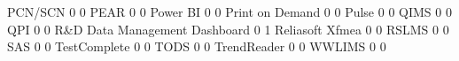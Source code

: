 \documentclass{article}
\begin{document}
\begin{Schunk}
\begin{Soutput}
  PCN/SCN                                                              0   0
  PEAR                                                                 0   0
  Power BI                                                             0   0
  Print on Demand                                                      0   0
  Pulse                                                                0   0
  QIMS                                                                 0   0
  QPI                                                                  0   0
  R&D Data Management Dashboard                                        0   1
  Reliasoft Xfmea                                                      0   0
  RSLMS                                                                0   0
  SAS                                                                  0   0
  TestComplete                                                         0   0
  TODS                                                                 0   0
  TrendReader                                                          0   0
  WWLIMS                                                               0   0
                                                           

\end{Soutput}
\end{Schunk}
\end{document}
